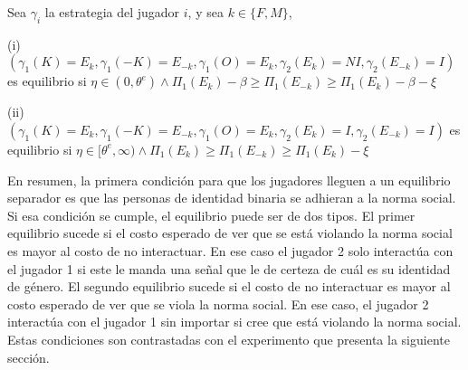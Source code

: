 \begin{figure}[!ht]
\begin{minipage}{\textwidth}
\end{minipage}
\end{figure}
\vspace*{0.5cm}
\vfill
\begin{framed}
\noindent Sea $\gamma_i$ la estrategia del jugador $i$, y  sea $k \in \{F,M\}$,

\noindent (i) $(\gamma_1(K)=E_k, \gamma_1(-K)=E_{-k}, \gamma_1(O)=E_k, \gamma_2(E_k)=NI, \gamma_2(E_{-k})=I)$ es equilibrio si $\eta\in(0, \theta^e) \wedge \Pi_1(E_{k})- \beta \geq \Pi_1(E_{-k}) \geq  \Pi_1(E_{k})- \beta - \xi$

\noindent (ii) $(\gamma_1(K)=E_k, \gamma_1(-K)=E_{-k}, \gamma_1(O)=E_k, \gamma_2(E_k)=I, \gamma_2(E_{-k})=I)$ es equilibrio si $\eta\in[\theta^e, \infty) \wedge \Pi_1(E_{k}) \geq \Pi_1(E_{-k}) \geq \Pi_1(E_{k})- \xi$
\end{framed}

En resumen, la primera condición para que los jugadores lleguen a un equilibrio separador es que las personas de identidad binaria se adhieran a la norma social. Si esa condición se cumple, el equilibrio puede ser de dos tipos. El primer equilibrio sucede si el costo esperado de ver que se está violando la norma social es mayor al costo de no interactuar. En ese caso el jugador 2 solo interactúa con el jugador 1 si este le manda una señal que le de certeza de cuál es su identidad de género. El segundo equilibrio sucede si el costo de no interactuar es mayor al costo esperado de ver que se viola la norma social. En ese caso, el jugador 2 interactúa con el jugador 1 sin importar si cree que está violando la norma social. Estas condiciones son contrastadas con el experimento que presenta la siguiente sección. 

